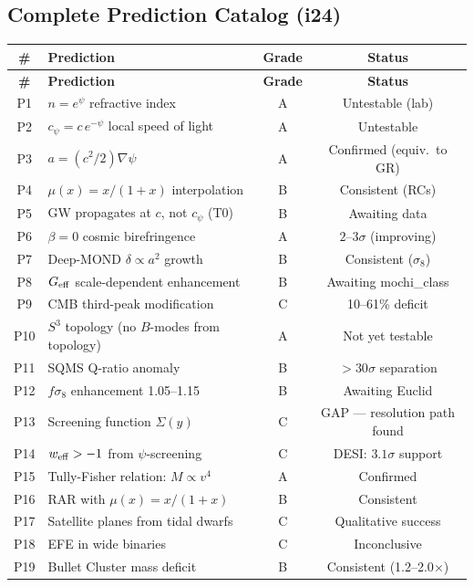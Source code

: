 \documentclass[11pt]{article}
\newcommand{\Geff}{G_{\rm eff}}
\begin{document}
\subsection{Complete Prediction Catalog (i24)}

\begin{longtable}{clcc}
\toprule
\textbf{\#} & \textbf{Prediction} & \textbf{Grade} & \textbf{Status} \\
\midrule
\endfirsthead
\toprule
\textbf{\#} & \textbf{Prediction} & \textbf{Grade} & \textbf{Status} \\
\midrule
\endhead
P1 & $n = e^\psi$ refractive index & A & Untestable (lab) \\
P2 & $c_\psi = c\,e^{-\psi}$ local speed of light & A & Untestable \\
P3 & $a = (c^2/2)\nabla\psi$ & A & Confirmed (equiv.\ to GR) \\
P4 & $\mu(x) = x/(1+x)$ interpolation & B & Consistent (RCs) \\
P5 & GW propagates at $c$, not $c_\psi$ (T0) & B & Awaiting data \\
P6 & $\beta = 0$ cosmic birefringence & A & $2$--$3\sigma$ (improving) \\
P7 & Deep-MOND $\delta \propto a^2$ growth & B & Consistent ($\sigma_8$) \\
P8 & $\Geff$ scale-dependent enhancement & B & Awaiting mochi\_class \\
P9 & CMB third-peak modification & C & 10--61\% deficit \\
P10 & $S^3$ topology (no $B$-modes from topology) & A & Not yet testable \\
P11 & SQMS Q-ratio anomaly & B & $>30\sigma$ separation \\
P12 & $f\sigma_8$ enhancement 1.05--1.15 & B & Awaiting Euclid \\
P13 & Screening function $\Sigma(y)$ & C & GAP --- resolution path found \\
P14 & $w_{\rm eff} > -1$ from $\psi$-screening & C & DESI: $3.1\sigma$ support \\
P15 & Tully-Fisher relation: $M \propto v^4$ & A & Confirmed \\
P16 & RAR with $\mu(x) = x/(1+x)$ & B & Consistent \\
P17 & Satellite planes from tidal dwarfs & C & Qualitative success \\
P18 & EFE in wide binaries & C & Inconclusive \\
P19 & Bullet Cluster mass deficit & B & Consistent (1.2--2.0$\times$) \\

\end{longtable}
\end{document}
